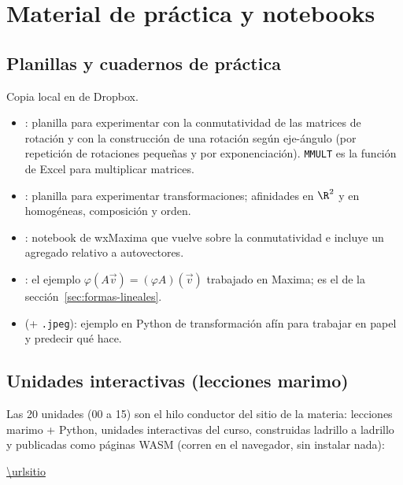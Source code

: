 \section{Material de práctica y notebooks}\label{cap:21}\label{ap:notebooks}

\subsection{Planillas y cuadernos de práctica}

Copia local en  de Dropbox.

\begin{itemize}
  \item {}: planilla
  para experimentar con la conmutatividad de las matrices de rotación y con la
  construcción de una rotación según eje-ángulo (por repetición de rotaciones pequeñas y por
  exponenciación). \texttt{MMULT} es la función de Excel para multiplicar matrices.
  \item {}: planilla para experimentar
  transformaciones; afinidades en \(\R^2\) y en homogéneas, composición y orden.
  \item {}: notebook de
  wxMaxima que vuelve sobre la conmutatividad e incluye un agregado
  relativo a autovectores.
  \item {}: el ejemplo \(\varphi(A\vec v)=(\varphi A)(\vec v)\)
  trabajado en Maxima; es el de la sección~\ref{sec:formas-lineales}.
  \item {} (+ \texttt{.jpeg}): ejemplo
  en Python de transformación afín para trabajar en papel y predecir qué hace.
\end{itemize}

\subsection{Unidades interactivas (lecciones marimo)}

Las 20 unidades (00 a 15) son el hilo conductor del sitio de la materia: lecciones marimo +
Python, unidades interactivas del curso, construidas ladrillo a ladrillo y publicadas como
páginas WASM (corren en el navegador, sin instalar nada):

\begin{center}\url{\urlsitio}\end{center}

